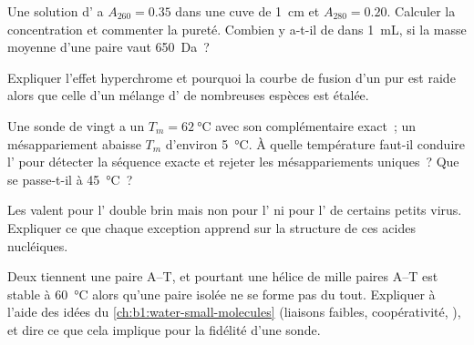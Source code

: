 \begin{exercise}[$\star\star$]\label{exo:b1:nucleic-acids:7}
Une solution d' a $A_{260} = 0.35$ dans une cuve de \qty{1}{cm} et
$A_{280} = 0.20$. Calculer la concentration et commenter la pureté.
Combien y a-t-il de  dans \qty{1}{mL}, si la masse
moyenne d'une paire vaut \qty{650}{Da}~?
\end{exercise}

\begin{exercise}[$\star\star$]\label{exo:b1:nucleic-acids:8}
Expliquer l'effet hyperchrome et pourquoi la courbe de fusion d'un 
pur est raide alors que celle d'un mélange d' de nombreuses espèces
est étalée.
\end{exercise}

\begin{exercise}[$\star\star$]\label{exo:b1:nucleic-acids:9}
Une sonde de vingt  a un $T_m = \qty{62}{\celsius}$ avec son
complémentaire exact~; un mésappariement abaisse $T_m$ d'environ
\qty{5}{\celsius}. À quelle température faut-il conduire l'
pour détecter la séquence exacte et rejeter les mésappariements
uniques~? Que se passe-t-il à \qty{45}{\celsius}~?
\end{exercise}

\begin{exercise}[$\star\star\star$]\label{exo:b1:nucleic-acids:10}
Les  valent pour l' double brin mais non pour l'
ni pour l' de certains petits virus. Expliquer ce que chaque
exception apprend sur la structure de ces acides nucléiques.
\end{exercise}

\begin{exercise}[$\star\star\star$]\label{exo:b1:nucleic-acids:11}
Deux  tiennent une paire A--T, et pourtant une hélice
de mille paires A--T est stable à \qty{60}{\celsius} alors qu'une paire
isolée ne se forme pas du tout. Expliquer à l'aide des idées du
\cref{ch:b1:water-small-molecules} (liaisons faibles, coopérativité,
), et dire ce que cela implique pour la fidélité d'une sonde.
\end{exercise}

